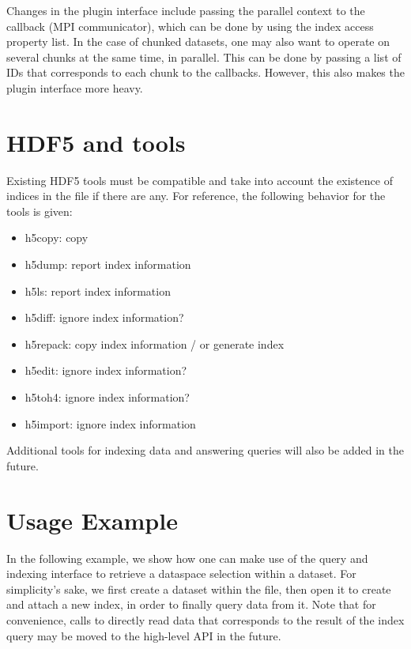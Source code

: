 \documentclass[letterpaper,hyper]{THG_RFC}
\begin{document}
Changes in the plugin interface include passing the parallel context to the
callback (MPI communicator), which can be done by using the index access property
list.
In the case of chunked datasets, one may also want to operate on several chunks
at the same time, in parallel. This can be done by passing a list of IDs that
corresponds to each chunk to the callbacks. However, this also makes the plugin
interface more heavy.

\section{HDF5 and tools}

Existing HDF5 tools must be compatible and take into account the existence of
indices in the file if there are any. For reference, the following behavior for
the tools is given:

\begin{itemize}
\item h5copy: copy
\item h5dump: report index information
\item h5ls: report index information
\item h5diff: ignore index information?
\item h5repack: copy index information / or generate index
\item h5edit: ignore index information?
\item h5toh4: ignore index information?
\item h5import: ignore index information
\end{itemize}

Additional tools for indexing data and answering queries will also be added
in the future.

\section{Usage Example}

In the following example, we show how one can make use of the query and
indexing interface to retrieve a dataspace selection within a dataset.
For simplicity's sake, we first create a dataset within the file, then open it to
create and attach a new index, in order to finally query data from it.
Note that for convenience, calls to directly read data that corresponds to the
result of the index query may be moved to the high-level API in the future.
\end{document}
